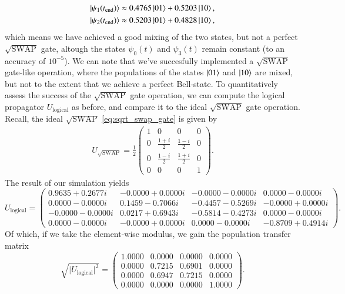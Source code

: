 \documentclass{subfiles}
\begin{document}
\begin{align*}
    \ket{\psi_1(t_{\text{end}})} &\approx 0.4765 \ket{01} + 0.5203 \ket{10}, \\
    \ket{\psi_2(t_{\text{end}})} &\approx 0.5203 \ket{01} + 0.4828 \ket{10},
\end{align*}
which means we have achieved a good mixing of the two states, but not a perfect $\sqrt{\text{SWAP}}$ gate, altough the states $\psi_0(t)$ and $\psi_3(t)$ remain constant (to an accuracy of $10^{-5}$). We can note that we've succesfully implemented a $\sqrt{\text{SWAP}}$ gate-like operation, where the populations of the states $\ket{01}$ and $\ket{10}$ are mixed, but not to the extent that we achieve a perfect Bell-state. 
To quantitatively assess the success of the $\sqrt{\text{SWAP}}$ gate operation, we can compute the logical propagator $U_{\text{logical}}$ as before, and compare it to the ideal $\sqrt{\text{SWAP}}$ gate operation. Recall, the ideal $\sqrt{\text{SWAP}}$ \ref{eq:sqrt_swap_gate} is given by 
\begin{align*}
    U_{\sqrt{\text{SWAP}}} = \frac{1}{{2}}\begin{pmatrix}
        1 & 0 & 0 & 0 \\
        0 & \frac{1 + i}{2} & \frac{1 - i}{2} & 0 \\
        0 & \frac{1 - i}{2} & \frac{1 + i}{2} & 0 \\
        0 & 0 & 0 & 1
    \end{pmatrix}.
\end{align*}
The result of our simulation yields
\begin{equation}
U_{\mathrm{logical}}
=\begin{pmatrix}
 0.9635 + 0.2677i & -0.0000 + 0.0000i & -0.0000 - 0.0000i &  0.0000 - 0.0000i\\
 0.0000 - 0.0000i &  0.1459 - 0.7066i & -0.4457 - 0.5269i & -0.0000 + 0.0000i\\
-0.0000 - 0.0000i &  0.0217 + 0.6943i & -0.5814 - 0.4273i &  0.0000 - 0.0000i\\
 0.0000 - 0.0000i & -0.0000 + 0.0000i &  0.0000 - 0.0000i & -0.8709 + 0.4914i
\end{pmatrix}.
\end{equation}
Of which, if we take the element-wise modulus, we gain the population transfer matrix
\begin{equation}
\sqrt{\lvert U_{\mathrm{logical}}\rvert^2}
=\begin{pmatrix}
1.0000 & 0.0000 & 0.0000 & 0.0000\\
0.0000 & 0.7215 & 0.6901 & 0.0000\\
0.0000 & 0.6947 & 0.7215 & 0.0000\\
0.0000 & 0.0000 & 0.0000 & 1.0000
\end{pmatrix}.
\end{equation}
\end{document}
